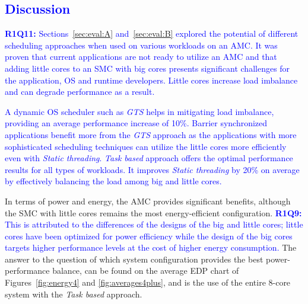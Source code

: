 \textcolor{blue}{
\section*{Discussion}
\textbf{R1Q11: }Sections~\ref{sec:eval:A} and~\ref{sec:eval:B} explored the potential of different scheduling approaches when used on various workloads on an AMC. 
It was proven that current applications are not ready to utilize an AMC and that adding little cores to an SMC with big cores presents significant challenges for the application, OS and runtime developers. 
Little cores increase load imbalance and can degrade performance as a result. 
}

\textcolor{blue}{
A dynamic OS scheduler such as \emph{GTS} helps in mitigating load imbalance, providing an average performance increase of 10\%.
Barrier synchronized applications benefit more from the \emph{GTS} approach as the applications with more sophisticated scheduling techniques can utilize the little cores more efficiently even with \emph{Static threading}.
\emph{Task based} approach offers the optimal performance results for all types of workloads.
It improves \emph{Static threading} by 20\% on average by effectively balancing the load among big and little cores.
}

In terms of power and energy, the AMC provides significant benefits, although the SMC with little cores remains the most energy-efficient configuration. 
\textcolor{blue}{
\textbf{R1Q9:} This is attributed to the differences of the designs of the big and little cores; little cores have been optimized for power efficiency while the design of the big cores targets higher performance levels at the cost of higher energy consumption.
}
The answer to the question of which system configuration provides the best power-performance balance, can be found on the average EDP chart of Figures~\ref{fig:energy4} and \ref{fig:averages4plus}, and is the use of the entire 8-core system with the \emph{Task based} approach.

